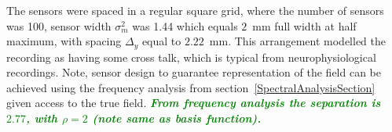 \documentclass[12pt]{iopart}
\newcommand{\omg}[1]{\textsf{\emph{\textbf{\textcolor{green}{#1}}}}}
\begin{document}
The sensors were spaced in a regular square grid, where the number of sensors was 100, sensor width $\sigma^2_m$ was 1.44 which equals $2$~mm full width at half maximum, with spacing $\Delta_y$ equal to $2.22$~mm. This arrangement modelled the recording as having some cross talk, which is typical from neurophysiological recordings. Note, sensor design to guarantee representation of the field can be achieved using the frequency analysis from section~\ref{SpectralAnalysisSection} given access to the true field. \omg{From frequency analysis the separation is $2.77$, with $\rho = 2$ (note same as basis function).} 
\end{document}

